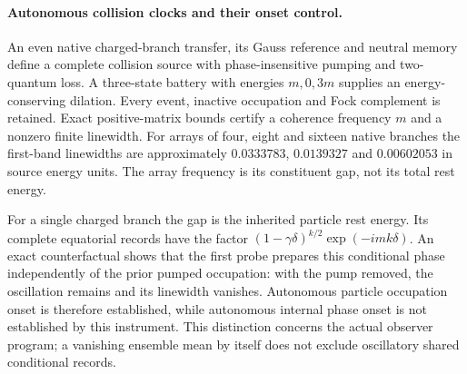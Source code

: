 \paragraph{Autonomous collision clocks and their onset control.}
An even native charged-branch transfer, its Gauss reference and neutral
memory define a complete collision source with phase-insensitive pumping
and two-quantum loss. A three-state battery with energies $m,0,3m$ supplies
an energy-conserving dilation. Every event, inactive occupation and Fock
complement is retained. Exact positive-matrix bounds certify a coherence
frequency $m$ and a nonzero finite linewidth. For arrays of four, eight and
sixteen native branches the first-band linewidths are approximately
$0.0333783$, $0.0139327$ and $0.00602053$ in source energy units. The array
frequency is its constituent gap, not its total rest energy.

For a single charged branch the gap is the inherited particle rest energy.
Its complete equatorial records have the factor
$(1-\gamma\delta)^{k/2}\exp(-imk\delta)$. An exact counterfactual shows
that the first probe prepares this conditional phase independently of the
prior pumped occupation: with the pump removed, the oscillation remains
and its linewidth vanishes. Autonomous particle occupation onset is
therefore established, while autonomous internal phase onset is not
established by this instrument. This distinction concerns the actual
observer program; a vanishing ensemble mean by itself does not exclude
oscillatory shared conditional records.
